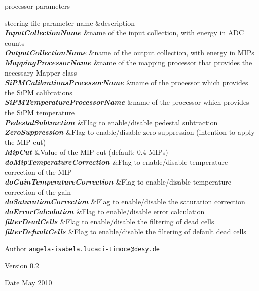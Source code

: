 \begin{DoxyParagraph}{processor parameters}
\begin{TabularC}{2}
\hline
steering file parameter name &description  \\
{\bfseries {\itshape  InputCollectionName \/}}&name of the input collection, with energy in ADC counts \\
{\bfseries {\itshape  OutputCollectionName \/}}&name of the output collection, with energy in MIPs \\
{\bfseries {\itshape  MappingProcessorName \/}}&name of the mapping processor that provides the necessary Mapper class \\
{\bfseries {\itshape  SiPMCalibrationsProcessorName \/}}&name of the processor which provides the SiPM calibrations \\
{\bfseries {\itshape  SiPMTemperatureProcessorName \/}}&name of the processor which provides the SiPM temperature \\
{\bfseries {\itshape  PedestalSubtraction \/}}&Flag to enable/disable pedestal subtraction \\
{\bfseries {\itshape  ZeroSuppression \/}}&Flag to enable/disable zero suppression (intention to apply the MIP cut) \\
{\bfseries {\itshape  MipCut \/}}&Value of the MIP cut (default: 0.4 MIPs) \\
{\bfseries {\itshape  doMipTemperatureCorrection \/}}&Flag to enable/disable temperature correction of the MIP \\
{\bfseries {\itshape  doGainTemperatureCorrection \/}}&Flag to enable/disable temperature correction of the gain \\
{\bfseries {\itshape  doSaturationCorrection \/}}&Flag to enable/disable the saturation correction \\
{\bfseries {\itshape  doErrorCalculation \/}}&Flag to enable/disable error calculation \\
{\bfseries {\itshape  filterDeadCells \/}}&Flag to enable/disable the filtering of dead cells \\
{\bfseries {\itshape  filterDefaultCells \/}}&Flag to enable/disable the filtering of default dead cells \\
\end{TabularC}

\end{DoxyParagraph}
\begin{DoxyAuthor}{Author}
{\tt angela-\/isabela.lucaci-\/timoce@desy.de} 
\end{DoxyAuthor}
\begin{DoxyVersion}{Version}
0.2 
\end{DoxyVersion}
\begin{DoxyDate}{Date}
May 2010 
\end{DoxyDate}


